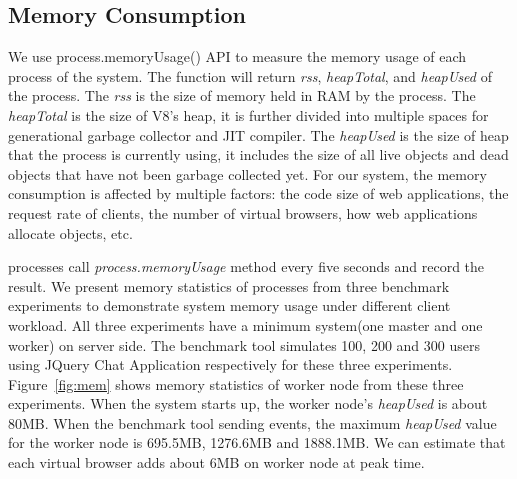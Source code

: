 \jquerychatlatency{}


\subsection{Memory Consumption}
We use \nodejs{} process.memoryUsage() API to measure the memory usage of each process
of the system.
The function will return \emph{rss}, \emph{heapTotal}, and \emph{heapUsed} of the process.
The \emph{rss} is the size of memory held in RAM by the process.
The \emph{heapTotal} is the size of V8's heap, it is further divided into
multiple spaces for generational garbage collector and JIT compiler.
The \emph{heapUsed} is the size of heap that the process is currently using,
it includes the size of all live objects and dead objects that have not been garbage collected yet.
For our system, the memory consumption is affected by multiple factors:
the code size of web applications, the request rate of clients,
the number of virtual browsers, how web applications allocate objects, etc.

\memfig{}

\cb{} processes call \emph{process.memoryUsage} method every five seconds and record
the result.
We present memory statistics of \cb{} processes from three benchmark experiments
 to demonstrate system memory usage under different client workload.
All three experiments have a minimum \cb{} system(one master and one worker) on server side.
The benchmark tool simulates 100, 200 and 300 users using JQuery Chat Application
respectively for these three experiments.
Figure~\ref{fig:mem} shows memory statistics of worker node from these three experiments.
When the system starts up, the worker node's \emph{heapUsed} is about 80MB.
When the benchmark tool sending events,
the maximum \emph{heapUsed} value for the worker node is
695.5MB, 1276.6MB and 1888.1MB.
We can estimate that each virtual browser adds about 6MB on worker node
at peak time.



